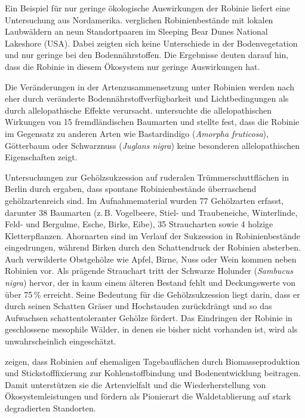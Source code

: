 \documentclass[twocolumn]{scrartcl}
\begin{document}
Ein Beispiel für nur geringe ökologische Auswirkungen der Robinie
liefert eine Untersuchung aus Nordamerika. \citet{deneau2013robinie}
verglichen Robinienbestände mit lokalen Laubwäldern an neun
Standortpaaren im Sleeping Bear Dunes National Lakeshore (USA). Dabei
zeigten sich keine Unterschiede in der Bodenvegetation und nur geringe
bei den Bodennährstoffen. Die Ergebnisse deuten darauf hin, dass die
Robinie in diesem Ökosystem nur geringe Auswirkungen hat.

Die Veränderungen in der Artenzusammensetzung unter Robinien werden
nach \citet{vitkova2017robinie} eher durch veränderte
Bodennährstoffverfügbarkeit und Lichtbedingungen als durch
allelopathische Effekte verursacht. \citet{csiszar2009allelopathy}
untersuchte die allelopathischen Wirkungen von 15 fremdländischen
Baumarten und stellte fest, dass die Robinie im Gegensatz zu anderen
Arten wie Bastardindigo (\emph{Amorpha fruticosa}), Götterbaum oder
Schwarznuss (\emph{Juglans nigra}) keine besonderen allelopathischen
Eigenschaften zeigt.

Untersuchungen zur Gehölzsukzession auf ruderalen Trümmerschuttflächen
in Berlin durch \citet{kowarik1990robinie} ergaben, dass spontane
Robinienbestände überraschend gehölzartenreich sind. Im
Aufnahmematerial wurden 77 Gehölzarten erfasst, darunter 38 Baumarten
(z.\,B. Vogelbeere, Stiel- und Traubeneiche, Winterlinde, Feld- und
Bergulme, Esche, Birke, Eibe), 35 Straucharten sowie 4 holzige
Kletterpflanzen. Ahornarten sind im Verlauf der Sukzession in
Robinienbestände eingedrungen, während Birken durch den Schattendruck
der Robinien absterben. Auch verwilderte Obstgehölze wie Apfel, Birne,
Nuss oder Wein kommen neben Robinien vor. Als prägende Strauchart
tritt der Schwarze Holunder (\emph{Sambucus nigra}) hervor, der in
kaum einem älteren Bestand fehlt und Deckungswerte von über 75\,\%
erreicht. Seine Bedeutung für die Gehölzsukzession liegt darin, dass
er durch seinen Schatten Gräser und Hochstauden zurückdrängt und so
das Aufwachsen schattentoleranter Gehölze fördert. Das Eindringen der
Robinie in geschlossene mesophile Wälder, in denen sie bisher nicht
vorhanden ist, wird als unwahrscheinlich eingeschätzt.

\citet{evans2013robinie} zeigen, dass Robinien auf ehemaligen
Tagebauflächen durch Biomasseproduktion und Stickstofffixierung zur
Kohlenstoffbindung und Bodenentwicklung beitragen. Damit unterstützen
sie die Artenvielfalt und die Wiederherstellung von
Ökosystemleistungen und fördern als Pionierart die Waldetablierung auf
stark degradierten Standorten.
\end{document}
